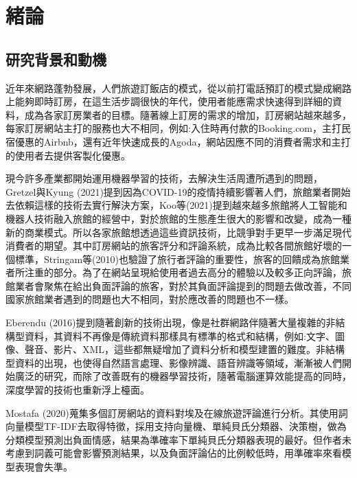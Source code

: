 %
%
\chapter{緒論}

\section{研究背景和動機}
		
	近年來網路蓬勃發展，人們旅遊訂飯店的模式，從以前打電話預訂的模式變成網路上能夠即時訂房，在這生活步調很快的年代，使用者能應需求快速得到詳細的資料，成為各家訂房業者的目標。隨著線上訂房的需求的增加，訂房網站越來越多，每家訂房網站主打的服務也大不相同，例如:入住時再付款的Booking.com，主打民宿優惠的Airbnb，還有近年快速成長的Agoda，網站因應不同的消費者需求和主打的使用者去提供客製化優惠。
	
	現今許多產業都開始運用機器學習的技術，去解決生活周遭所遇到的問題，Gretzel與Kyung (2021)提到因為COVID-19的疫情持續影響著人們，旅館業者開始去依賴這樣的技術去實行解決方案，Koo等(2021)提到越來越多旅館將人工智能和機器人技術融入旅館的經營中，對於旅館的生態產生很大的影響和改變，成為一種新的商業模式。所以各家旅館想透過這些資訊技術，比競爭對手更早一步滿足現代消費者的期望。其中訂房網站的旅客評分和評論系統，成為比較各間旅館好壞的一個標準，Stringam等(2010)也驗證了旅行者評論的重要性，旅客的回饋成為旅館業者所注重的部分。為了在網站呈現給使用者過去高分的體驗以及較多正向評論，旅館業者會聚焦在給出負面評論的旅客，對於其負面評論提到的問題去做改善，不同國家旅館業者遇到的問題也大不相同，對於應改善的問題也不一樣。
	
\newpage
	
	Eberendu (2016)提到隨著創新的技術出現，像是社群網路伴隨著大量複雜的非結構型資料，其資料不再像是傳統資料那樣具有標準的格式和結構，例如:文字、圖像、聲音、影片、XML，這些都無疑增加了資料分析和模型建置的難度。非結構型資料的出現，也使得自然語言處理、影像辨識、語音辨識等領域，漸漸被人們開始廣泛的研究，而除了改善既有的機器學習技術，隨著電腦運算效能提高的同時，深度學習的技術也重新浮上檯面。
	
	Mostafa (2020)蒐集多個訂房網站的資料對埃及在線旅遊評論進行分析。其使用詞向量模型TF-IDF去取得特徵，採用支持向量機、單純貝氏分類器、決策樹，做為分類模型預測出負面情感，結果為準確率下單純貝氏分類器表現的最好。但作者未考慮到詞義可能會影響預測結果，以及負面評論佔的比例較低時，用準確率來看模型表現會失準。
	

